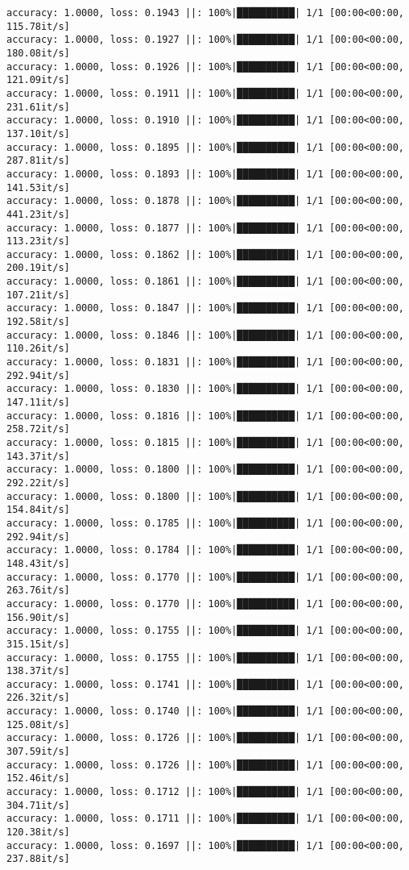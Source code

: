 \documentclass[
]{article}
\begin{document}
\begin{verbatim}
accuracy: 1.0000, loss: 0.1943 ||: 100%|██████████| 1/1 [00:00<00:00, 115.78it/s]
accuracy: 1.0000, loss: 0.1927 ||: 100%|██████████| 1/1 [00:00<00:00, 180.08it/s]
accuracy: 1.0000, loss: 0.1926 ||: 100%|██████████| 1/1 [00:00<00:00, 121.09it/s]
accuracy: 1.0000, loss: 0.1911 ||: 100%|██████████| 1/1 [00:00<00:00, 231.61it/s]
accuracy: 1.0000, loss: 0.1910 ||: 100%|██████████| 1/1 [00:00<00:00, 137.10it/s]
accuracy: 1.0000, loss: 0.1895 ||: 100%|██████████| 1/1 [00:00<00:00, 287.81it/s]
accuracy: 1.0000, loss: 0.1893 ||: 100%|██████████| 1/1 [00:00<00:00, 141.53it/s]
accuracy: 1.0000, loss: 0.1878 ||: 100%|██████████| 1/1 [00:00<00:00, 441.23it/s]
accuracy: 1.0000, loss: 0.1877 ||: 100%|██████████| 1/1 [00:00<00:00, 113.23it/s]
accuracy: 1.0000, loss: 0.1862 ||: 100%|██████████| 1/1 [00:00<00:00, 200.19it/s]
accuracy: 1.0000, loss: 0.1861 ||: 100%|██████████| 1/1 [00:00<00:00, 107.21it/s]
accuracy: 1.0000, loss: 0.1847 ||: 100%|██████████| 1/1 [00:00<00:00, 192.58it/s]
accuracy: 1.0000, loss: 0.1846 ||: 100%|██████████| 1/1 [00:00<00:00, 110.26it/s]
accuracy: 1.0000, loss: 0.1831 ||: 100%|██████████| 1/1 [00:00<00:00, 292.94it/s]
accuracy: 1.0000, loss: 0.1830 ||: 100%|██████████| 1/1 [00:00<00:00, 147.11it/s]
accuracy: 1.0000, loss: 0.1816 ||: 100%|██████████| 1/1 [00:00<00:00, 258.72it/s]
accuracy: 1.0000, loss: 0.1815 ||: 100%|██████████| 1/1 [00:00<00:00, 143.37it/s]
accuracy: 1.0000, loss: 0.1800 ||: 100%|██████████| 1/1 [00:00<00:00, 292.22it/s]
accuracy: 1.0000, loss: 0.1800 ||: 100%|██████████| 1/1 [00:00<00:00, 154.84it/s]
accuracy: 1.0000, loss: 0.1785 ||: 100%|██████████| 1/1 [00:00<00:00, 292.94it/s]
accuracy: 1.0000, loss: 0.1784 ||: 100%|██████████| 1/1 [00:00<00:00, 148.43it/s]
accuracy: 1.0000, loss: 0.1770 ||: 100%|██████████| 1/1 [00:00<00:00, 263.76it/s]
accuracy: 1.0000, loss: 0.1770 ||: 100%|██████████| 1/1 [00:00<00:00, 156.90it/s]
accuracy: 1.0000, loss: 0.1755 ||: 100%|██████████| 1/1 [00:00<00:00, 315.15it/s]
accuracy: 1.0000, loss: 0.1755 ||: 100%|██████████| 1/1 [00:00<00:00, 138.37it/s]
accuracy: 1.0000, loss: 0.1741 ||: 100%|██████████| 1/1 [00:00<00:00, 226.32it/s]
accuracy: 1.0000, loss: 0.1740 ||: 100%|██████████| 1/1 [00:00<00:00, 125.08it/s]
accuracy: 1.0000, loss: 0.1726 ||: 100%|██████████| 1/1 [00:00<00:00, 307.59it/s]
accuracy: 1.0000, loss: 0.1726 ||: 100%|██████████| 1/1 [00:00<00:00, 152.46it/s]
accuracy: 1.0000, loss: 0.1712 ||: 100%|██████████| 1/1 [00:00<00:00, 304.71it/s]
accuracy: 1.0000, loss: 0.1711 ||: 100%|██████████| 1/1 [00:00<00:00, 120.38it/s]
accuracy: 1.0000, loss: 0.1697 ||: 100%|██████████| 1/1 [00:00<00:00, 237.88it/s]

\end{verbatim}
\end{document}

